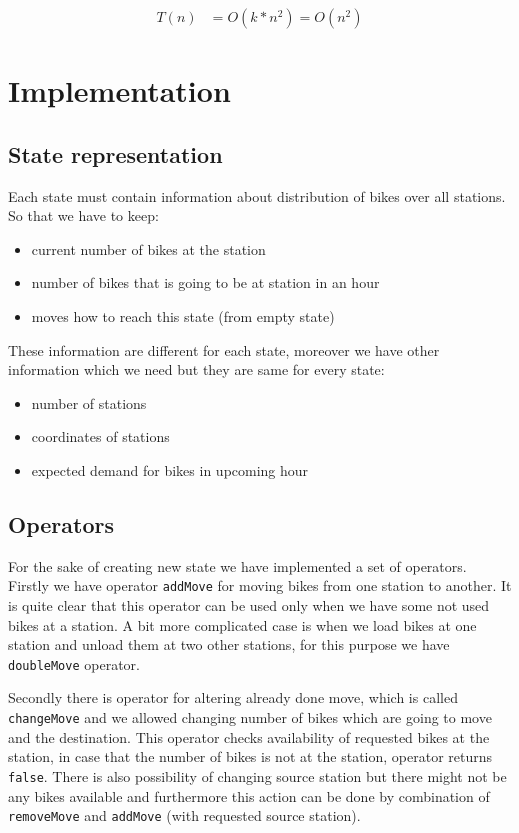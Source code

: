 \documentclass[11pt,twoside,a4paper]{mr}%
\begin{document}
\begin{align}
 T(n) &= O( k* n^2 ) = O( n^2 )
\end{align}



\chapter{Implementation}
\section{State representation} 
Each state must contain information about distribution of bikes over all stations. So that we have to keep:
\begin{itemize}
\item current number of bikes at the station
\item number of bikes that is going to be at station in an hour 
\item moves how to reach this state (from empty state)
\end{itemize}
These information are different for each state, moreover we have other information which we need but they are same for every state:
\begin{itemize}
 \item number of stations
 \item coordinates of stations
 \item expected demand for bikes in upcoming hour
\end{itemize}


\section{Operators}
For the sake of creating new state we have implemented a set of operators. Firstly we have operator \texttt{addMove} for moving bikes from one station to another. It is quite clear that this operator can be used only when we have some not used bikes at a station. A bit more complicated case is when we load bikes at one station and unload them at two other stations, for this purpose we have \texttt{doubleMove} operator.

Secondly there is operator for altering already done move, which is called \texttt{changeMove} and we allowed changing number of bikes which are going to move and the destination. This operator checks availability of requested bikes at the station, in case that the number of bikes is not at the station, operator returns \texttt{false}. There is also possibility of changing source station but there might not be any bikes available and furthermore this action can be done by combination of \texttt{removeMove} and \texttt{addMove} (with requested source station).
\end{document}

